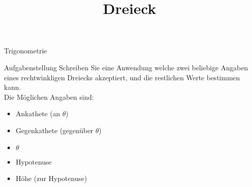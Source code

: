 \documentclass{article}
\title{Dreieck}
\begin{document}
	 \begin{section}{Trigonometrie}
	 	\begin{subsection}{Aufgabenstellung}
	 		Schreiben Sie eine Anwendung welche zwei beliebige Angaben eines rechtwinkligen Dreiecks akzeptiert, und die restlichen Werte bestimmen kann.\\
	 		Die Möglichen Angaben sind:
	 		\begin{itemize}
	 			\item Ankathete (an $\theta$)
	 			\item Gegenkathete (gegenüber $\theta$)
	 			\item $\theta$
	 			\item Hypotenuse
	 			\item Höhe (zur Hypotenuse)
	 		\end{itemize}
	 	\end{subsection}
	 \end{section}
\end{document}
